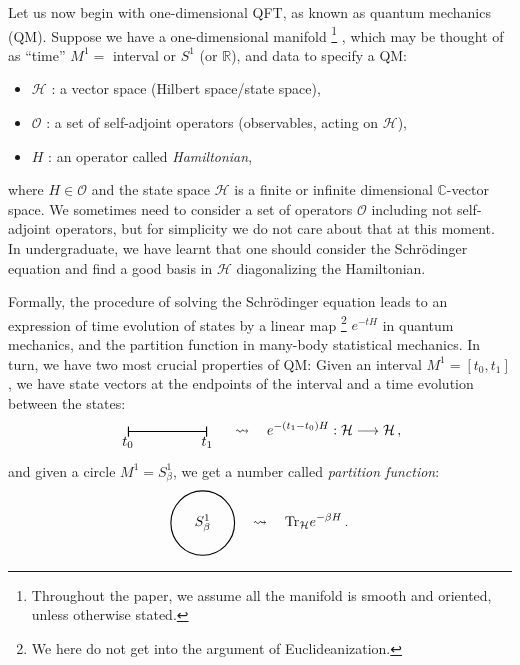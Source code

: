 Let us now begin with one-dimensional QFT, as known as quantum mechanics
(QM). Suppose we have a one-dimensional manifold%
%
\footnote{Throughout the paper, we assume all the manifold is smooth and oriented,
unless otherwise stated. }%
%
, which may be thought of as ``time'' $M^{1}=$ interval or $S^{1}$
(or $\mathbb{R}$), and data to specify a QM: 
\begin{itemize}
 \item $\mathcal{H}$ : a vector space (Hilbert space/state space), 
 \item $\mathcal{O}$ : a set of self-adjoint operators (observables, acting
on $\mathcal{H}$),
 \item $H$ : an operator called \emph{Hamiltonian}, 
\end{itemize}
where $H\in\mathcal{O}$ and the state space $\mathcal{H}$ is a finite
or infinite dimensional $\mathbb{C}$-vector space. We sometimes need
to consider a set of operators $\mathcal{O}$ including not self-adjoint
operators, but for simplicity we do not care about that at this moment.
In undergraduate, we have learnt that one should consider the Schr\"{o}dinger
equation and find a good basis in $\mathcal{H}$ diagonalizing the
Hamiltonian. 

Formally, the procedure of solving the Schr\"{o}dinger equation leads
to an expression of time evolution of states by a linear map%
%
\footnote{We here do not get into the argument of Euclideanization.}
%
$e^{-tH}$ in quantum mechanics, and the partition function in many-body
statistical mechanics. In turn, we have two most crucial properties
of QM: Given an interval $M^{1}=\left[t_{0},t_{1}\right]$, we have
state vectors at the endpoints of the interval and a time evolution
between the states: 
\begin{equation}
    \begin{tikzpicture}[scale=1.0, baseline=(x.base)]    \node (x) at (0,0) {\vphantom{x}};
        
        \draw[thick, arrows=|-|] (0,0) node[below=0.1] {$t_0$} -- (2,0) node[below=0.1] {$t_1$};
        
    \end{tikzpicture}
  \quad \rightsquigarrow \quad
  e^{-\left(t_{1}-t_{0}\right)H} : \mathcal{H}  \longrightarrow  \mathcal{H} \, ,
\end{equation}
 and given a circle $M^{1}=S_{\beta}^{1}$, we get a number called
\emph{partition function}:
\begin{equation}
    \begin{tikzpicture}[scale=0.8, baseline=(x.base)]    \node (x) at (0,0) {\vphantom{x}};
        
        \draw[thick] (0,0) circle[radius=1cm] node {$S^1_{\beta}$};
        
    \end{tikzpicture}
  \quad \rightsquigarrow \quad
  \mathrm{Tr}_{\mathcal{H}}  e^{-\beta H} \, .
\end{equation}


